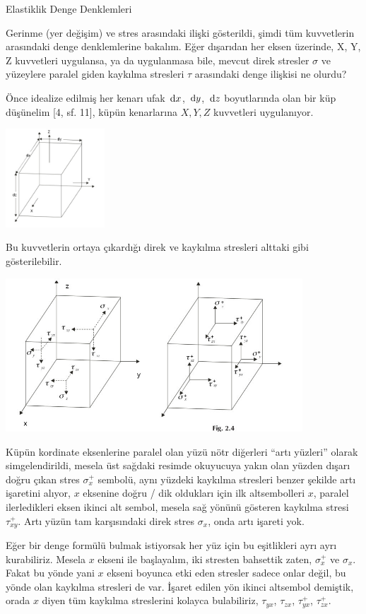\documentclass[12pt,fleqn]{article}\usepackage{../../common}
\begin{document}
Elastiklik Denge Denklemleri

Gerinme (yer değişim) ve stres arasındaki ilişki gösterildi, şimdi tüm
kuvvetlerin arasındaki denge denklemlerine bakalım. Eğer dışarıdan her eksen
üzerinde, X, Y, Z kuvvetleri uygulansa, ya da uygulanmasa bile, mevcut direk
stresler $\sigma$ ve yüzeylere paralel giden kaykılma stresleri $\tau$
arasındaki denge ilişkisi ne olurdu?

Önce idealize edilmiş her kenarı ufak $\,\mathrm{d} x$, $\,\mathrm{d} y$, $\,\mathrm{d} z$ boyutlarında
olan bir küp düşünelim [4, sf. 11], küpün kenarlarına $X,Y,Z$ kuvvetleri
uygulanıyor.

\includegraphics[width=10em]{equilibrium_stress2.jpg}

Bu kuvvetlerin ortaya çıkardığı direk ve kaykılma stresleri alttaki gibi
gösterilebilir.

\includegraphics[width=30em]{equilibrium_stress1.jpg}

Küpün kordinate eksenlerine paralel olan yüzü nötr diğerleri ``artı yüzleri''
olarak simgelendirildi, mesela üst sağdaki resimde okuyucuya yakın olan yüzden
dışarı doğru çıkan stres $\sigma_x^+$ sembolü, aynı yüzdeki kaykılma stresleri
benzer şekilde artı işaretini alıyor, $x$ eksenine doğru / dik oldukları için
ilk altsembolleri $x$, paralel ilerledikleri eksen ikinci alt sembol, mesela sağ
yönünü gösteren kaykılma stresi $\tau_{xy}^+$. Artı yüzün tam karşısındaki direk
stres $\sigma_x$, onda artı işareti yok.

Eğer bir denge formülü bulmak istiyorsak her yüz için bu eşitlikleri ayrı ayrı
kurabiliriz. Mesela $x$ ekseni ile başlayalım, iki stresten bahsettik zaten,
$\sigma_x^+$ ve $\sigma_x$. Fakat bu yönde yani $x$ ekseni boyunca etki eden
stresler sadece onlar değil, bu yönde olan kaykılma stresleri de var. İşaret
edilen yön ikinci altsembol demiştik, orada $x$ diyen tüm kaykılma streslerini
kolayca bulabiliriz, $\tau_{yx}$, $\tau_{zx}$, $\tau_{yx}^+$, $\tau_{zx}^+$.
\end{document}
